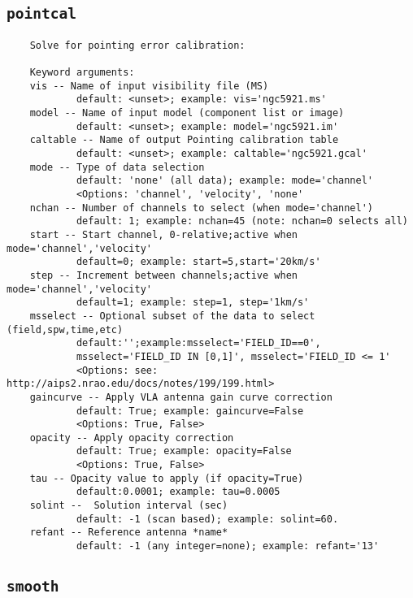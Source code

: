 \subsection{{\tt pointcal}}
\label{section:tasks.pointcal}

\small
\begin{verbatim}
    Solve for pointing error calibration:
    
    Keyword arguments:
    vis -- Name of input visibility file (MS)
            default: <unset>; example: vis='ngc5921.ms'
    model -- Name of input model (component list or image)
            default: <unset>; example: model='ngc5921.im'
    caltable -- Name of output Pointing calibration table
            default: <unset>; example: caltable='ngc5921.gcal'
    mode -- Type of data selection
            default: 'none' (all data); example: mode='channel'
            <Options: 'channel', 'velocity', 'none'
    nchan -- Number of channels to select (when mode='channel')
            default: 1; example: nchan=45 (note: nchan=0 selects all)
    start -- Start channel, 0-relative;active when mode='channel','velocity'
            default=0; example: start=5,start='20km/s'
    step -- Increment between channels;active when mode='channel','velocity'
            default=1; example: step=1, step='1km/s'
    msselect -- Optional subset of the data to select (field,spw,time,etc)
            default:'';example:msselect='FIELD_ID==0', 
            msselect='FIELD_ID IN [0,1]', msselect='FIELD_ID <= 1'
            <Options: see: http://aips2.nrao.edu/docs/notes/199/199.html>
    gaincurve -- Apply VLA antenna gain curve correction
            default: True; example: gaincurve=False
            <Options: True, False>
    opacity -- Apply opacity correction
            default: True; example: opacity=False
            <Options: True, False>
    tau -- Opacity value to apply (if opacity=True)
            default:0.0001; example: tau=0.0005
    solint --  Solution interval (sec)
            default: -1 (scan based); example: solint=60.
    refant -- Reference antenna *name*
            default: -1 (any integer=none); example: refant='13'
\end{verbatim}
\normalsize


\subsection{{\tt smooth}}
\label{section:tasks.smooth}

